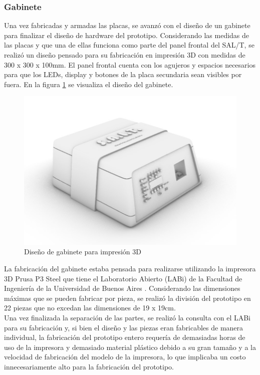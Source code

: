 \subsubsection{Gabinete}

Una vez fabricadas y armadas las placas, se avanzó con el diseño de un gabinete para finalizar el diseño de hardware del prototipo. Considerando las medidas de las placas y que una de ellas funciona como parte del panel frontal del SAL/T, se realizó un diseño pensado para su fabricación en impresión 3D con medidas de 300 x 300 x 100mm. El panel frontal cuenta con los agujeros y espacios necesarios para que los LEDs, display y botones de la placa secundaria sean visibles por fuera. En la figura \ref{fig:gabinete_3d} se visualiza el diseño del gabinete.   

\begin{figure}[H]
    \centering
    \includegraphics[width = \linewidth]{img/gabinete.jpeg}
    \caption{Diseño de gabinete para impresión 3D}
    \label{fig:gabinete_3d}
\end{figure}    

La fabricación del gabinete estaba pensada para realizarse utilizando la impresora 3D Prusa P3 Steel que tiene el Laboratorio Abierto (LABi) de la Facultad de Ingeniería de la Universidad de Buenos Aires \cite{labi_3d}. Considerando las dimensiones máximas que se pueden fabricar por pieza, se realizó la división del prototipo en 22 piezas que no excedan las dimensiones de 19 x 19cm. \\ 

Una vez finalizada la separación de las partes, se realizó la consulta con el LABi para su fabricación y, si bien el diseño y las piezas eran fabricables de manera individual, la fabricación del prototipo entero requería de demasiadas horas de uso de la impresora y demasiado material plástico debido a su gran tamaño y a la velocidad de fabricación del modelo de la impresora, lo que implicaba un costo innecesariamente alto para la fabricación del prototipo. \\ 

